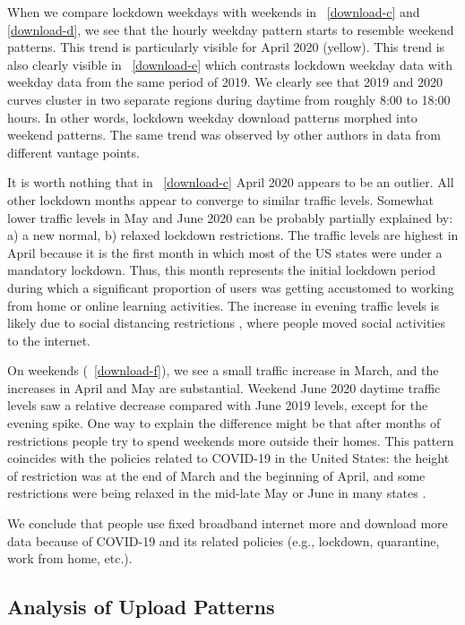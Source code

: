 When we compare lockdown weekdays with weekends in \figurename~\ref{download-c} and \ref{download-d}, we see that the hourly weekday pattern starts to resemble weekend patterns. This trend is particularly visible for April 2020 (yellow). This trend is also clearly visible in \figurename~\ref{download-e} which contrasts lockdown weekday data with weekday data from the same period of 2019. We clearly see that 2019 and 2020 curves cluster in two separate regions during daytime from roughly 8:00 to 18:00 hours. In other words, lockdown weekday download patterns morphed into weekend patterns. The same trend was observed by other authors in data from different vantage points.%

It is worth nothing that in \figurename~\ref{download-c} April 2020 appears to be an outlier. All other lockdown months appear to converge to similar traffic levels. Somewhat lower traffic levels in May and June 2020 can be probably partially explained by: a) a new normal, b) relaxed lockdown restrictions. The traffic levels are highest in April because it is the first month in which most of the US states were under a mandatory lockdown. Thus, this month represents the initial lockdown period during which a significant proportion of users was getting accustomed to working from home or online learning activities. The increase in evening traffic levels is likely due to social distancing restrictions \cite{lockdownsguide}, where people moved social activities to the internet.

On weekends (\figurename~\ref{download-f}), we see a small traffic increase in March, and the increases in April and May are substantial. Weekend June 2020 daytime traffic levels saw a relative decrease compared with June 2019 levels, except for the evening spike. One way to explain the difference might be that after months of restrictions people try to spend weekends more outside their homes. This pattern coincides with the policies related to COVID-19 in the United States: the height of restriction was at the end of March and the beginning of April, and some restrictions were being relaxed in the mid-late May or June in many states \cite{covid19restriction}.

We conclude that people use fixed broadband internet more and download more data because of COVID-19 and its related policies (e.g., lockdown, quarantine, work from home, etc.).

\subsection{Analysis of Upload Patterns}
\label{sec:analysis-of-upload-patterns}


